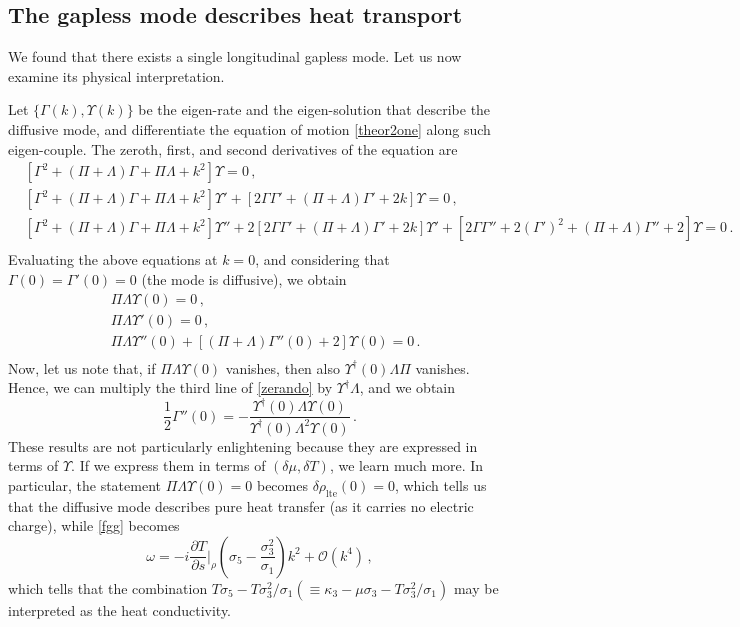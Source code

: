 \documentclass[a4paper, amsfonts, amssymb, amsmath, reprint, showkeys, nofootinbib, twoside,notitlepage]{revtex4-1}
\theoremstyle{definition}
\theoremstyle{theorem}
\begin{document}
\subsection{The gapless mode describes heat transport}

We found that there exists a single longitudinal gapless mode. Let us now examine its physical interpretation. 

Let $\{\Gamma(k),\Upsilon(k)\}$ be the eigen-rate and the eigen-solution that describe the diffusive mode, and differentiate the equation of motion \eqref{theor2one} along such eigen-couple. The zeroth, first, and second derivatives of the equation are
\begin{equation}
\begin{split}
& [\Gamma^2+(\Pi{+}\Lambda) \Gamma +\Pi \Lambda+k^2]\Upsilon =0 \, ,\\
& [\Gamma^2+(\Pi{+}\Lambda) \Gamma +\Pi \Lambda+k^2]\Upsilon' +[2\Gamma\Gamma'+(\Pi{+}\Lambda) \Gamma'+2k]\Upsilon =0\, ,\\
& [\Gamma^2+(\Pi{+}\Lambda) \Gamma +\Pi \Lambda+k^2]\Upsilon'' +2[2\Gamma\Gamma'+(\Pi{+}\Lambda) \Gamma'+2k]\Upsilon'+[2\Gamma\Gamma''+2(\Gamma')^2+(\Pi{+}\Lambda) \Gamma''+2]\Upsilon =0\, .\\
\end{split}
\end{equation}
Evaluating the above equations at $k=0$, and considering that $\Gamma(0)=\Gamma'(0)=0$ (the mode is diffusive), we obtain
\begin{equation}\label{zerando}
\begin{split}
& \Pi \Lambda\Upsilon(0) =0 \, ,\\
& \Pi \Lambda\Upsilon'(0) =0\, ,\\
& \Pi \Lambda\Upsilon''(0) +[(\Pi{+}\Lambda) \Gamma''(0)+2]\Upsilon(0) =0\, .\\
\end{split}
\end{equation}
Now, let us note that, if $\Pi\Lambda\Upsilon(0)$ vanishes, then also $\Upsilon^\dagger(0) \Lambda\Pi$ vanishes. Hence, we can multiply the third line of \eqref{zerando} by $\Upsilon^\dagger \Lambda$, and we obtain
\begin{equation}\label{fgg}
\dfrac{1}{2}\Gamma''(0)=-\dfrac{\Upsilon^\dagger(0) \Lambda \Upsilon(0)}{\Upsilon^\dagger(0) \Lambda^2 \Upsilon(0)}\, .
\end{equation}
These results are not particularly enlightening because they are expressed in terms of $\Upsilon$. If we express them in terms of $(\delta\mu,\delta T)$, we learn much more. In particular, the statement $\Pi \Lambda\Upsilon(0) =0$ becomes $\delta \rho_\text{lte}(0)=0$, which tells us that the diffusive mode describes pure heat transfer (as it carries no electric charge), while \eqref{fgg} becomes
\begin{equation}
\omega=-i\dfrac{\partial T}{\partial s}\bigg|_\rho \left( \sigma_5 -\dfrac{\sigma_3^2}{\sigma_1}\right)k^2+\mathcal{O}(k^4) \, ,
\end{equation}
which tells that the combination $T\sigma_5-T\sigma_3^2/\sigma_1(\equiv\kappa_3-\mu\sigma_3-T\sigma_3^2/\sigma_1)$ may be interpreted as the heat conductivity.
\end{document}

